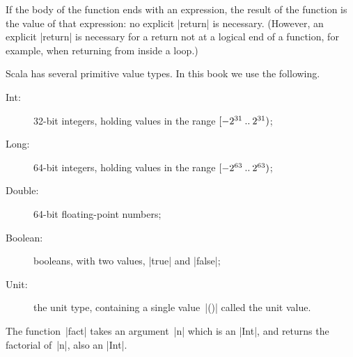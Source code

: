 If the body of the function ends with an expression, the result of the
function is the value of that expression: no explicit
|return| is necessary.  (However, an explicit |return| is
necessary for a return not at a logical end of a function, for example, when
returning from inside a loop.)


Scala has several primitive value types.  In this book we
use the following.
\begin{description}
\item[{\scalashape Int}:] 32-bit integers, holding values in
  the range $[-2^{31} \mathbin{..} 2^{31})$;

\item[{\scalashape Long}:] 64-bit integers, holding values in
  the range $[-2^{63} \mathbin{..} 2^{63})$;

\item[{\scalashape Double}:] 64-bit floating-point numbers;

\item[{\scalashape Boolean}:] booleans, with two values,
  |true| and |false|;

\item[{\scalashape Unit}:] the unit type, containing a single
  value~|()|\ScalaIndex{()} called the unit value.
\end{description}

The function~|fact| takes an argument~|n| which is an |Int|, and returns the
factorial of~|n|, also an |Int|.




